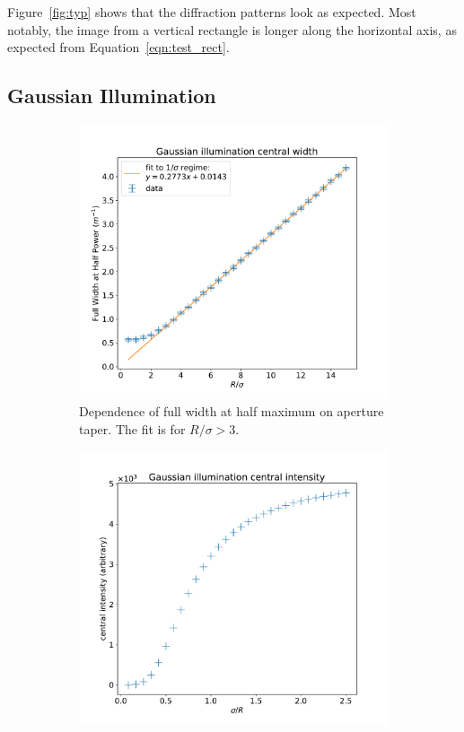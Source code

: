 \documentclass[11pt]{article}
\begin{document}
Figure~\ref{fig:typ} shows that the diffraction patterns look as expected. Most notably, the image from a vertical rectangle is longer along the horizontal axis, as expected from Equation~\ref{eqn:test_rect}.

\subsection{Gaussian Illumination}\label{sec:res:gauss}
\begin{figure}
    \centering
    \begin{subfigure}{0.5\textwidth}
        \centering
        \includegraphics[width=\textwidth]{pictures/gauss/size.pdf}
        \caption{Dependence of full width at half maximum on aperture taper. The fit is for $R/\sigma > 3$.}\label{fig:gauss:size}
    \end{subfigure}%
    \begin{subfigure}{0.5\textwidth}
        \centering
        \includegraphics[width=\textwidth]{pictures/gauss/int.pdf}

\end{subfigure}
\end{figure}
\end{document}
